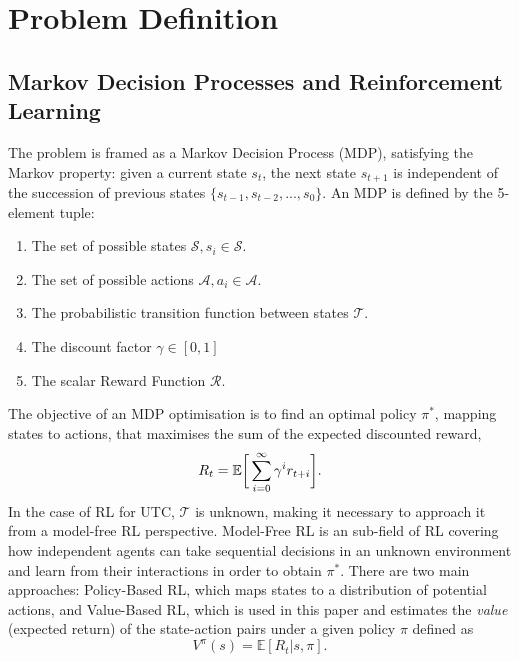 \documentclass[conference]{IEEEtran}
\begin{document}
\section{Problem Definition}
\label{problem}
\subsection{Markov Decision Processes and Reinforcement Learning}
The problem is framed as a Markov Decision Process (MDP), satisfying the Markov property: given a current state $s_t$, the next state $s_{t+1}$ is independent of the succession of previous states $\{s_{t-1}, s_{t-2}, ..., s_0\}$.
An MDP is defined by the 5-element tuple:
\begin{enumerate}
\item The set of possible states $\mathcal{S}, s_i\in \mathcal{S}$.
\item The set of possible actions $\mathcal{A}, a_i\in \mathcal{A}$.
\item The probabilistic transition function between states $\mathcal{T}$.
\item The discount factor $\gamma \in [0,1]$ 
\item The scalar Reward Function $\mathcal{R}$. 
\end{enumerate}

The objective of an MDP optimisation is to find an optimal policy $\pi^*$, mapping states to actions, that maximises the sum of the expected discounted reward,
\begin{equation}
R_t = \mathbb{E} \bigg{[} \sum^{\infty}_{i=0} \gamma^i r_{t+i} \bigg{]} .
\label{eq:reward}
\end{equation}
In the case of RL for UTC, $\mathcal{T}$ is unknown, making it necessary to approach it from a model-free RL perspective.
Model-Free RL is an sub-field of RL covering how independent agents can take sequential decisions in an unknown environment and learn from their interactions in order to obtain $\pi^*$. 
There are two main approaches: Policy-Based RL, which maps states to a distribution of potential actions, and Value-Based RL, which is used in this paper and estimates the {\em value} (expected return) of the state-action pairs under a given policy $\pi$ defined  as
\begin{equation}
V^{\pi}(s) = \mathbb{E} [R_t|s,\pi].
\label{eq:value}
\end{equation}
\end{document}
